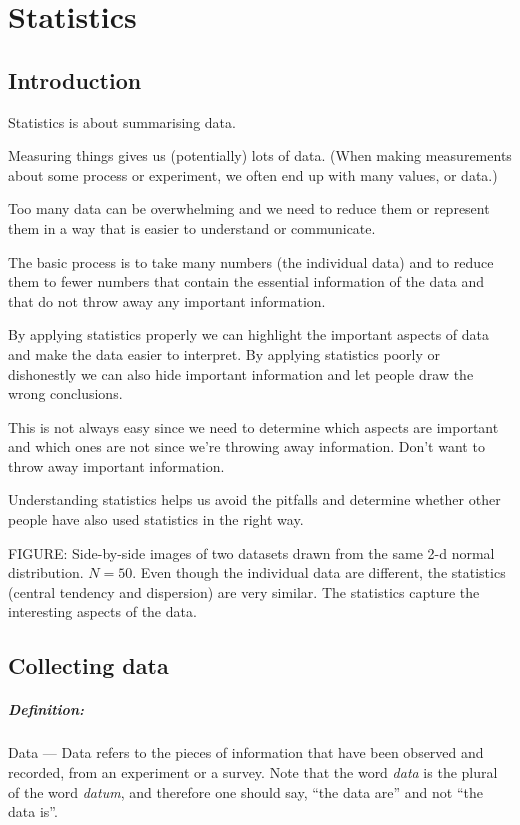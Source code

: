 \documentclass[a4paper,11pt]{report}
\def\Definition#1#2{\paragraph{Definition:} #1 --- #2}
\begin{document}
\chapter{Statistics}

\section{Introduction}

Statistics is about summarising data.

Measuring things gives us (potentially) lots of data.
(When making measurements about some process or experiment, we often
end up with many values, or data.)

Too many data can be overwhelming and we need to reduce them or
represent them in a way that is easier to understand or communicate.

The basic process is to take many numbers (the individual data) and to
reduce them to fewer numbers that contain the essential information of
the data and that do not throw away any important information.

By applying statistics properly we can highlight the important aspects
of data and make the data easier to interpret. By applying statistics
poorly or dishonestly we can also hide important information and let
people draw the wrong conclusions.

This is not always easy since we need to determine which aspects are
important and which ones are not since we're throwing away
information. Don't want to throw away important information.

Understanding statistics helps us avoid the pitfalls and determine
whether other people have also used statistics in the right way.

FIGURE: Side-by-side images of two datasets drawn from the same 2-d
normal distribution. $N = 50$. Even though the individual data are
different, the statistics (central tendency and dispersion) are very
similar. The statistics capture the interesting aspects of the data.

\section{Collecting data}
\Definition{Data}{Data refers to the pieces of information that have
  been observed and recorded, from an experiment or a survey. Note
  that the word {\em data} is the plural of the word {\em datum}, and
  therefore one should say, ``the data are'' and not ``the data is''.}
\end{document}
